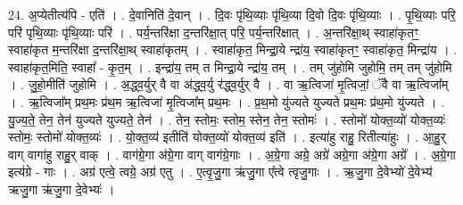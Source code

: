 \documentclass[17pt]{extarticle}
\begin{document}
24. अ॒प्येतीत्य॑पि - एति॑ । . दे॒वानिति॑ दे॒वान् । . दि॒वः पृ॑थि॒व्याः पृ॑थि॒व्या दि॒वो दि॒वः पृ॑थि॒व्याः । . पृ॒थि॒व्याः परि॒ परि॑ पृथि॒व्याः पृ॑थि॒व्याः परि॑ । . पर्य॒न्तरि॑क्षा द॒न्तरि॑क्षा॒त् परि॒ पर्य॒न्तरि॑क्षात् । . अ॒न्तरि॑क्षा॒थ् स्वाहा॑कृतꣳ॒॒ स्वाहा॑कृत म॒न्तरि॑क्षा द॒न्तरि॑क्षा॒थ् स्वाहा॑कृतम् । . स्वाहा॑कृत॒ मिन्द्रा॒ये न्द्रा॑य॒ स्वाहा॑कृतꣳ॒॒ स्वाहा॑कृत॒ मिन्द्रा॑य । . स्वाहा॑कृत॒मिति॒ स्वाहा᳚ - कृ॒त॒म् । . इन्द्रा॑य॒ तम् त मिन्द्रा॒ये न्द्रा॑य॒ तम् । . तम् जु॑होमि जुहोमि॒ तम् तम् जु॑होमि । . जु॒हो॒मीति॑ जुहोमि । . अ॒द्ध्व॒र्युर् वै वा अ॑द्ध्व॒र्यु र॑द्ध्व॒र्युर् वै । . वा ऋ॒त्विजा॑ मृ॒त्विजां॒ ॅवै वा ऋ॒त्विजा᳚म् । . ऋ॒त्विजा᳚म् प्रथ॒मः प्र॑थ॒म ऋ॒त्विजा॑ मृ॒त्विजा᳚म् प्रथ॒मः । . प्र॒थ॒मो यु॑ज्यते युज्यते प्रथ॒मः प्र॑थ॒मो यु॑ज्यते । . यु॒ज्य॒ते॒ तेन॒ तेन॑ युज्यते युज्यते॒ तेन॑ । . तेन॒ स्तोमः॒ स्तोम॒ स्तेन॒ तेन॒ स्तोमः॑ । . स्तोमो॑ योक्त॒व्यो॑ योक्त॒व्यः॑ स्तोमः॒ स्तोमो॑ योक्त॒व्यः॑ । . यो॒क्त॒व्य॑ इतीति॑ योक्त॒व्यो॑ योक्त॒व्य॑ इति॑ । . इत्या॑हु राहु॒ रितीत्या॑हुः । . आ॒हु॒र् वाग् वागा॑हु राहु॒र् वाक् । . वाग॑ग्रे॒गा अ॑ग्रे॒गा वाग् वाग॑ग्रे॒गाः । . अ॒ग्रे॒गा अग्रे॒ अग्रे॑ अग्रे॒गा अ॑ग्रे॒गा अग्रे᳚ । . अ॒ग्रे॒गा इत्य॑ग्रे - गाः । . अग्र॑ एत्वे॒ त्वग्रे॒ अग्र॑ एतु । . ए॒त्वृ॒जु॒गा ऋ॑जु॒गा ए᳚त्वे त्वृजु॒गाः । . ऋ॒जु॒गा दे॒वेभ्यो॑ दे॒वेभ्य॑ ऋजु॒गा ऋ॑जु॒गा दे॒वेभ्यः॑ । \newline
\end{document}

